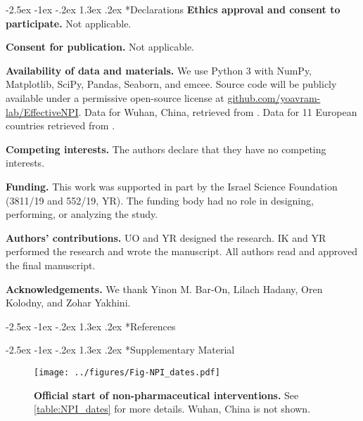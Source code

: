 \documentclass[12pt]{extarticle}
\makeatletter
\renewcommand\section{\@startsection {section}{1}{\z@}%
     {-2.5ex \@plus -1ex \@minus -.2ex}%
     {1.3ex \@plus.2ex}%
    {\Large\bfseries}}
\newcommand{\beginsupplement}{%
      	\setcounter{table}{0}
        \renewcommand{\thetable}{S\arabic{table}}%
        \setcounter{figure}{0}
        \renewcommand{\thefigure}{S\arabic{figure}}%
}
\makeatother
\begin{document}
{\small
\section*{Declarations}
\textbf{Ethics approval and consent to participate.} Not applicable.

\textbf{Consent for publication.} Not applicable.

\textbf{Availability of data and materials.} We use Python 3 with NumPy, Matplotlib, SciPy, Pandas, Seaborn, and emcee.
Source code will be publicly available under a permissive open-source license at \href{http://github.com/yoavram-lab/EffectiveNPI}{github.com/yoavram-lab/EffectiveNPI}.
Data for Wuhan, China, retrieved from \citet{Pei2020}.
Data for 11 European countries retrieved from \citet{Flaxman2020}.

\textbf{Competing interests.} The authors declare that they have no competing interests.

\textbf{Funding.} This work was supported in part by the Israel Science Foundation (3811/19 and 552/19, YR). The funding body had no role in designing, performing, or analyzing the study.

\textbf{Authors' contributions.} UO and YR designed the research. IK and YR performed the research and wrote the manuscript. All authors read and approved the final manuscript.

\textbf{Acknowledgements.} 
We thank Yinon M. Bar-On, Lilach Hadany, Oren Kolodny, and Zohar Yakhini. %
} %



\section*{References}
\nolinenumbers

%




\section*{Supplementary Material}
\beginsupplement %



\begin{figure}[h]
    \centering
	\texttt{[image: ../figures/Fig-NPI\_dates.pdf]}
    \caption{
    \textbf{Official start of non-pharmaceutical interventions.}
	See \autoref{table:NPI_dates} for more details. Wuhan, China is not shown.
    } 
    \label{fig:NPI_dates}
\end{figure}
\end{document}
